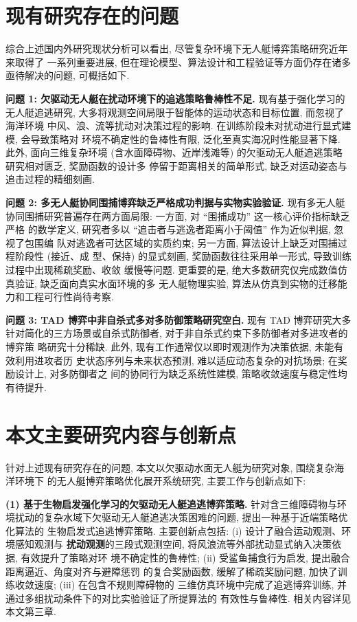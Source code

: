\section{现有研究存在的问题}
\label{sec:gap}
综合上述国内外研究现状分析可以看出, 尽管复杂环境下无人艇博弈策略研究近年来取得了
一系列重要进展, 但在理论模型、算法设计和工程验证等方面仍存在诸多亟待解决的问题,
可概括如下.

\textbf{问题 1: 欠驱动无人艇在扰动环境下的追逃策略鲁棒性不足.} 现有基于强化学习的
无人艇追逃研究, 大多将观测空间局限于智能体的运动状态和目标位置, 而忽视了海洋环境
中风、浪、流等扰动对决策过程的影响. 在训练阶段未对扰动进行显式建模, 会导致策略对
环境不确定性的鲁棒性有限, 泛化至真实海况时性能显著下降. 此外, 面向三维复杂环境
(含水面障碍物、近岸浅滩等) 的欠驱动无人艇追逃策略研究相对匮乏, 奖励函数的设计多
停留于距离相关的简单形式, 缺乏对运动姿态与追击过程的精细刻画.

\textbf{问题 2: 多无人艇协同围捕博弈缺乏严格成功判据与实物实验验证.} 现有多无人艇
协同围捕研究普遍存在两方面局限: 一方面, 对 ``围捕成功'' 这一核心评价指标缺乏严格
的数学定义, 研究者多以 ``追击者与逃逸者距离小于阈值'' 作为近似判据, 忽视了包围编
队对逃逸者可达区域的实质约束; 另一方面, 算法设计上缺乏对围捕过程阶段性 (接近、成
型、保持) 的显式刻画, 奖励函数往往采用单一形式, 导致训练过程中出现稀疏奖励、收敛
缓慢等问题. 更重要的是, 绝大多数研究仅完成数值仿真验证, 缺乏面向真实水面环境的多
无人艇物理实验, 算法从仿真到实物的迁移能力和工程可行性尚待考察.

\textbf{问题 3: TAD 博弈中非自杀式多对多防御策略研究空白.} 现有 TAD 博弈研究大多
针对简化的三方场景或自杀式防御者, 对于非自杀式约束下多防御者对多进攻者的博弈策
略研究十分稀缺. 此外, 现有工作通常仅以即时观测作为决策依据, 未能有效利用进攻者历
史状态序列与未来状态预测, 难以适应动态复杂的对抗场景; 在奖励设计上, 对多防御者之
间的协同行为缺乏系统性建模, 策略收敛速度与稳定性均有待提升.

\section{本文主要研究内容与创新点}
\label{sec:contribution}
针对上述现有研究存在的问题, 本文以欠驱动水面无人艇为研究对象, 围绕复杂海洋环境下
的无人艇博弈策略优化展开系统研究, 主要工作与创新点如下:

\textbf{(1) 基于生物启发强化学习的欠驱动无人艇追逃博弈策略.} 针对含三维障碍物与环
境扰动的复杂水域下欠驱动无人艇追逃决策困难的问题, 提出一种基于近端策略优化算法的
生物启发式追逃博弈策略. 主要创新点包括: (i) 设计了融合运动观测、环境感知观测与\textbf{
扰动观测}的三段式观测空间, 将风浪流等外部扰动显式纳入决策依据, 有效提升了策略对环
境不确定性的鲁棒性; (ii) 受鲨鱼捕食行为启发, 提出融合距离逼近、角度对齐与避障惩罚
的复合奖励函数, 缓解了稀疏奖励问题, 加快了训练收敛速度; (iii) 在包含不规则障碍物的
三维仿真环境中完成了追逃博弈训练, 并通过多组扰动条件下的对比实验验证了所提算法的
有效性与鲁棒性. 相关内容详见本文第三章.

